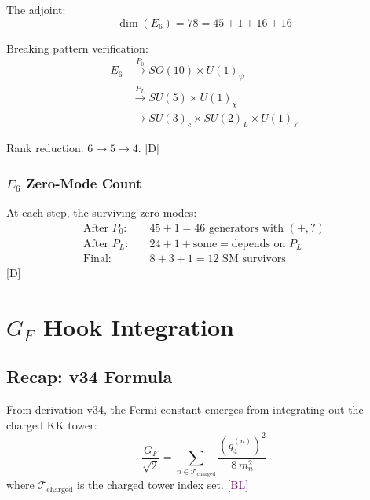 \documentclass[11pt,a4paper]{article}
\newcommand{\tagD}{\textcolor{blue!70!black}{[D]}}
\newcommand{\tagBL}{\textcolor{purple}{[BL]}}
\begin{document}
The adjoint:
\begin{equation}
\label{eq:e6-adj}
\dim(E_6) = 78 = 45 + 1 + 16 + 16
\end{equation}

Breaking pattern verification:
\begin{align}
\label{eq:e6-break-1}
E_6 &\xrightarrow{P_0} SO(10) \times U(1)_\psi \\
\label{eq:e6-break-2}
&\xrightarrow{P_L} SU(5) \times U(1)_\chi \\
\label{eq:e6-break-3}
&\xrightarrow{} SU(3)_c \times SU(2)_L \times U(1)_Y
\end{align}

Rank reduction: $6 \to 5 \to 4$. \tagD

\subsubsection{$E_6$ Zero-Mode Count}

At each step, the surviving zero-modes:
\begin{align}
\label{eq:e6-zero-step1}
\text{After } P_0: \quad & 45 + 1 = 46 \text{ generators with } (+,?) \\
\label{eq:e6-zero-step2}
\text{After } P_L: \quad & 24 + 1 + \text{some} = \text{depends on } P_L \\
\label{eq:e6-zero-final}
\text{Final}: \quad & 8 + 3 + 1 = 12 \text{ SM survivors}
\end{align}
\tagD

\section{$G_F$ Hook Integration}

\subsection{Recap: v34 Formula}

From derivation v34, the Fermi constant emerges from integrating out the charged
KK tower:
\begin{equation}
\label{eq:GF-v34}
\frac{G_F}{\sqrt{2}} = \sum_{n \in \mathcal{T}_{\text{charged}}} \frac{(g_4^{(n)})^2}{8\, m_n^2}
\end{equation}
where $\mathcal{T}_{\text{charged}}$ is the charged tower index set. \tagBL
\end{document}
